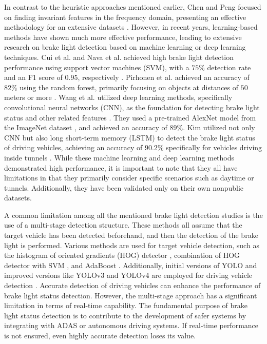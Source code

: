 In contrast to the heuristic approaches mentioned earlier, Chen and Peng focused on finding invariant features in the frequency domain, presenting an effective methodology for an extensive datasets \cite{chen2012frequency}.
However, in recent years, learning-based methods have shown much more effective performance, leading to extensive research on brake light detection based on machine learning or deep learning techniques.
Cui et al. and Nava et al. achieved high brake light detection performance using support vector machines (SVM), with a $75\%$ detection rate and an F1 score of $0.95$, respectively \cite{cui2015vision, nava2019collision}. 
Pirhonen et al. achieved an accuracy of $82\%$ using the random forest, primarily focusing on objects at distances of $50$ meters or more \cite{pirhonen2022brake}.
Wang et al. utilized deep learning methods, specifically convolutional neural networks (CNN), as the foundation for detecting brake light status and other related features \cite{wang2016appearance}.
They used a pre-trained AlexNet model \cite{krizhevsky2012imagenet} from the ImageNet dataset \cite{russakovsky2015imagenet}, and achieved an accuracy of $89\%$.
Kim utilized not only CNN but also long short-term memory (LSTM) to detect the brake light status of driving vehicles, achieving an accuracy of $90.2\%$ specifically for vehicles driving inside tunnels \cite{kim2022detecting}.
While these machine learning and deep learning methods demonstrated high performance, it is important to note that they all have limitations in that they primarily consider specific scenarios such as daytime or tunnels.
Additionally, they have been validated only on their own nonpublic datasets.

A common limitation among all the mentioned brake light detection studies is the use of a multi-stage detection structure.
These methods all assume that the target vehicle has been detected beforehand, and then the detection of the brake light is performed.
Various methods are used for target vehicle detection, such as the histogram of oriented gradients (HOG) detector \cite{chen2015daytime, wang2016appearance}, combination of HOG detector with SVM \cite{cui2015vision}, and AdaBoost \cite{liu2015vision, freund1996experiments}.
Additionally, initial versions of YOLO \cite{redmon2016you, redmon2017yolo9000} and improved versions like YOLOv3 \cite{redmon2018yolov3} and YOLOv4 \cite{bochkovskiy2020yolov4} are employed for driving vehicle detection \cite{pirhonen2022brake, kim2022detecting}.
Accurate detection of driving vehicles can enhance the performance of brake light status detection. 
However, the multi-stage approach has a significant limitation in terms of real-time capability. 
The fundamental purpose of brake light status detection is to contribute to the development of safer systems by integrating with ADAS or autonomous driving systems. If real-time performance is not ensured, even highly accurate detection loses its value.

